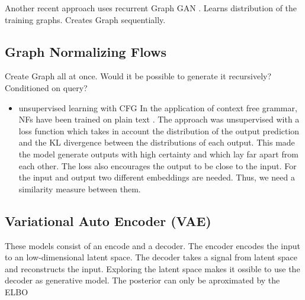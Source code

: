 Another recent approach uses recurrent Graph GAN \cite{li_learning_2018}. Learns distribution of the training graphs. Creates Graph sequentially.

\subsection{Graph Normalizing Flows}
Create Graph all at once. Would it be possible to generate it recursively? Conditioned on query?
\begin{itemize}
    \item unsupervised learning with CFG
    In the application of context free grammar, NFs have been trained on plain text \cite{jin_unsupervised_2019}. The approach was unsupervised with a loss function which takes in account the distribution of the output prediction and the KL divergence between the distributions of each output. This made the model generate outputs with high certainty and which lay far apart from each other. The loss also encourages the output to be close to the input. For the input and output two different embeddings are needed. Thus, we need a similarity measure between them.
    
\end{itemize}

\subsection{Variational Auto Encoder (VAE)}

These models consist of an encode and a decoder. The encoder encodes the input to an low-dimensional latent space. The decoder takes a signal from latent space and reconstructs the input. 
Exploring the latent space makes it ossible to use the decoder as generative model.
The posterior can only be aproximated by the ELBO